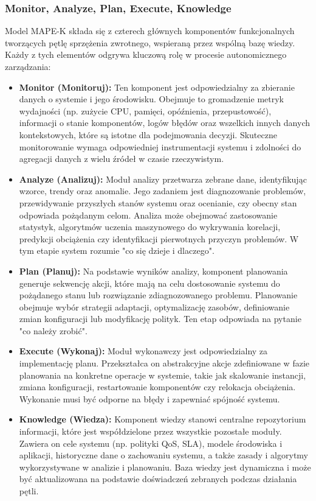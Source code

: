 \subsubsection{Monitor, Analyze, Plan, Execute, Knowledge}
Model MAPE-K składa się z czterech głównych komponentów funkcjonalnych tworzących pętlę sprzężenia zwrotnego, wspieraną przez wspólną bazę wiedzy. Każdy z tych elementów odgrywa kluczową rolę w procesie autonomicznego zarządzania:

\begin{itemize}
    \item \textbf{Monitor (Monitoruj):} Ten komponent jest odpowiedzialny za zbieranie danych o systemie i jego środowisku. Obejmuje to gromadzenie metryk wydajności (np. zużycie CPU, pamięci, opóźnienia, przepustowość), informacji o stanie komponentów, logów błędów oraz wszelkich innych danych kontekstowych, które są istotne dla podejmowania decyzji. Skuteczne monitorowanie wymaga odpowiedniej instrumentacji systemu i zdolności do agregacji danych z wielu źródeł w czasie rzeczywistym.
    \item \textbf{Analyze (Analizuj):} Moduł analizy przetwarza zebrane dane, identyfikując wzorce, trendy oraz anomalie. Jego zadaniem jest diagnozowanie problemów, przewidywanie przyszłych stanów systemu oraz ocenianie, czy obecny stan odpowiada pożądanym celom. Analiza może obejmować zastosowanie statystyk, algorytmów uczenia maszynowego do wykrywania korelacji, predykcji obciążenia czy identyfikacji pierwotnych przyczyn problemów. W tym etapie system rozumie "co się dzieje i dlaczego".
    \item \textbf{Plan (Planuj):} Na podstawie wyników analizy, komponent planowania generuje sekwencję akcji, które mają na celu dostosowanie systemu do pożądanego stanu lub rozwiązanie zdiagnozowanego problemu. Planowanie obejmuje wybór strategii adaptacji, optymalizację zasobów, definiowanie zmian konfiguracji lub modyfikację polityk. Ten etap odpowiada na pytanie "co należy zrobić".
    \item \textbf{Execute (Wykonaj):} Moduł wykonawczy jest odpowiedzialny za implementację planu. Przekształca on abstrakcyjne akcje zdefiniowane w fazie planowania na konkretne operacje w systemie, takie jak skalowanie instancji, zmiana konfiguracji, restartowanie komponentów czy relokacja obciążenia. Wykonanie musi być odporne na błędy i zapewniać spójność systemu.
    \item \textbf{Knowledge (Wiedza):} Komponent wiedzy stanowi centralne repozytorium informacji, które jest współdzielone przez wszystkie pozostałe moduły. Zawiera on cele systemu (np. polityki QoS, SLA), modele środowiska i aplikacji, historyczne dane o zachowaniu systemu, a także zasady i algorytmy wykorzystywane w analizie i planowaniu. Baza wiedzy jest dynamiczna i może być aktualizowana na podstawie doświadczeń zebranych podczas działania pętli.
\end{itemize}

